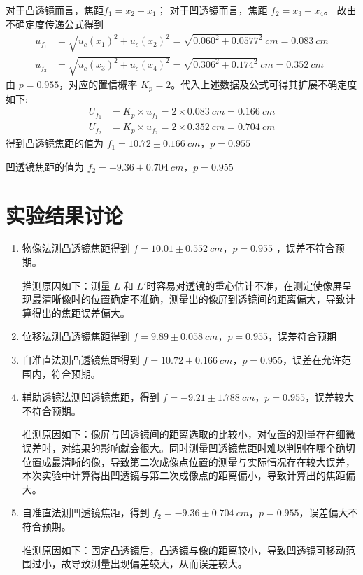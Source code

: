 \documentclass[UTF8]{ctexart}
\begin{document}
对于凸透镜而言，焦距$f_1 = x_2 - x_1$；
对于凹透镜而言，焦距 $f_2 = x_3 - x_4$。
故由不确定度传递公式得到
\begin{align*}
    u_{f_{1}} &= \sqrt{
    u_c(x_1)^2 + u_c(x_2)^2
    } = \sqrt{0.060^2 + 0.0577^2} \ cm = 0.083 \ cm  \\
     u_{f_{2}} &= \sqrt{
    u_c(x_3)^2 + u_c(x_4)^2
    } = \sqrt{0.306^2 + 0.174^2}\ cm= 0.352 \ cm  
\end{align*}
由 $p=0.955$，对应的置信概率 $K_p=2$。代入上述数据及公式可得其扩展不确定度如下:
\begin{align*}
    U_{f_{1}} &= K_p \times u_{f_{1}} = 2 \times 0.083 \ cm = 0.166 \ cm \\
    U_{f_{2}} &= K_p \times u_{f_{2}} = 2 \times 0.352 \ cm = 0.704 \ cm
\end{align*}
得到凸透镜焦距的值为 $f_1 = 10.72 \pm 0.166 \ cm$，$p = 0.955$

凹透镜焦距的值为 $f_2 = -9.36 \pm 0.704 \ cm$，$p = 0.955$


\section{实验结果讨论}
\begin{enumerate}
    \item 物像法测凸透镜焦距得到 $f = 10.01 \pm 0.552 \ cm$，$p = 0.955$ ，误差不符合预期。
    
    推测原因如下：测量 $L$ 和 $L'$时容易对透镜的重心估计不准，在测定使像屏呈现最清晰像时的位置确定不准确，测量出的像屏到透镜间的距离偏大，导致计算得出的焦距误差偏大。
    \item 位移法测凸透镜焦距得到 $f = 9.89 \pm 0.058 \ cm$，$p = 0.955$，误差符合预期
    \item 自准直法测凸透镜焦距得到 $f = 10.72 \pm 0.166 \ cm$，$p = 0.955$，误差在允许范围内，符合预期。
    \item 辅助透镜法测凹透镜焦距，得到 $f = -9.21 \pm 1.788 \ cm$，$p = 0.955$，误差较大不符合预期。
    
    推测原因如下：像屏与凹透镜间的距离选取的比较小，对位置的测量存在细微误差时，对结果的影响就会很大。同时测量凹透镜焦距时难以判别在哪个确切位置成最清晰的像，导致第二次成像点位置的测量与实际情况存在较大误差，本次实验中计算得出凹透镜与第二次成像点的距离偏小，导致计算出的焦距偏大。
    \item 自准直法测凹透镜焦距，得到 $f_2 = -9.36 \pm 0.704 \ cm$，$p = 0.955$，误差偏大不符合预期。
    
    推测原因如下：固定凸透镜后，凸透镜与像的距离较小，导致凹透镜可移动范围过小，故导致测量出现偏差较大，从而误差较大。
\end{enumerate}
\end{document}
